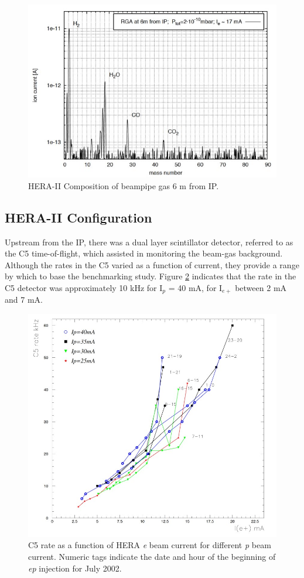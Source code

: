 	
\begin{figure}
	\centering
	\includegraphics[width=.75\textwidth]{../../img/hera_badvac_comp.jpg}	
	\caption {HERA-II Composition of beampipe gas 6 m from IP. }
	\label{fig:hera2}
\end{figure}
	
\subsection{HERA-II Configuration}
Upstream from the IP, there was a dual layer scintillator detector, referred to as the C5 time-of-flight, which assisted in monitoring the beam-gas background.   Although the rates in the C5 varied as a function of current, they provide a range by which to base the benchmarking study.  Figure \ref{fig:hera3} indicates that the rate in the C5 detector was approximately 10 kHz for I$_{p}$ = 40 mA, for I$_{e+}$ between 2 mA and 7 mA. 

\begin{figure}
	\centering
	\includegraphics[width=.75\textwidth]{../../img/hera_c5_rate.jpg}
	\caption{C5 rate as a function of HERA \textit{e} beam current for different \textit{p} beam current.  Numeric tags indicate the date and hour of the beginning of \textit{ep} injection for July 2002.}
	\label{fig:hera3}
\end{figure}


